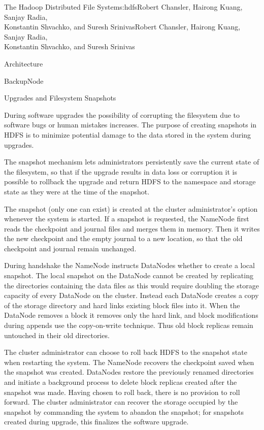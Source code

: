 \begin{aosachaptertoc}{The Hadoop Distributed File System}{s:hdfs}{Robert Chansler, Hairong Kuang, Sanjay Radia, \\ Konstantin Shvachko, and Suresh Srinivas}{Robert Chansler, Hairong Kuang, Sanjay Radia, \\ \hspace*{0.9cm} Konstantin Shvachko, and Suresh Srinivas}
\begin{aosasect1}{Architecture}
\begin{aosasect2}{BackupNode}
\end{aosasect2}

\begin{aosasect2}{Upgrades and Filesystem Snapshots}

During software upgrades the possibility of corrupting the filesystem
due to software bugs or human mistakes increases. The purpose of
creating snapshots in HDFS is to minimize potential damage to the data
stored in the system during upgrades.

The snapshot mechanism lets administrators persistently save the
current state of the filesystem, so that if the upgrade results in
data loss or corruption it is possible to rollback the upgrade and
return HDFS to the namespace and storage state as they were at the
time of the snapshot.

The snapshot (only one can exist) is created at the cluster
administrator's option whenever the system is started. If a snapshot
is requested, the NameNode first reads the checkpoint and journal
files and merges them in memory. Then it writes the new checkpoint and
the empty journal to a new location, so that the old checkpoint and
journal remain unchanged.

During handshake the NameNode instructs DataNodes whether to create a
local snapshot. The local snapshot on the DataNode cannot be created
by replicating the directories containing the data files as this would require
doubling the storage capacity of every DataNode on the
cluster. Instead each DataNode creates a copy of the storage directory
and hard links existing block files into it. When the DataNode removes
a block it removes only the hard link, and block modifications during
appends use the copy-on-write technique.  Thus old block replicas
remain untouched in their old directories.

The cluster administrator can choose to roll back HDFS to the snapshot
state when restarting the system. The NameNode recovers the checkpoint
saved when the snapshot was created. DataNodes restore the previously
renamed directories and initiate a background process to delete block
replicas created after the snapshot was made. Having chosen to roll
back, there is no provision to roll forward. The cluster administrator
can recover the storage occupied by the snapshot by commanding the
system to abandon the snapshot; for snapshots created during upgrade,
this finalizes the software upgrade.


\end{aosasect2}
\end{aosasect1}
\end{aosachaptertoc}
